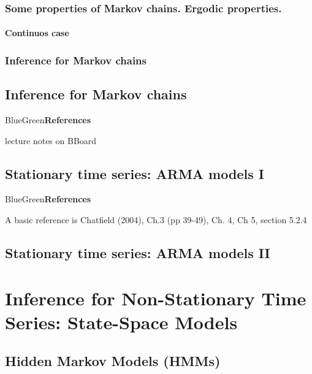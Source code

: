 \documentclass[dvipsnames,12pt]{book}
\begin{document}
        \section{Some properties of Markov chains. Ergodic properties.}

            \subsection{Continuos case}

        \section{Inference for Markov chains}

    \chapter{Inference for Markov chains}

            \begin{mybox}{BlueGreen}{\textbf{References}}

                lecture notes on BBoard
                
            \end{mybox}

    \chapter{Stationary time series: ARMA models I}

            \begin{mybox}{BlueGreen}{\textbf{References}}

                A basic reference is Chatfield (2004), Ch.3 (pp 39-49), Ch. 4, Ch 5, section 5.2.4
                
            \end{mybox}

    \chapter{Stationary time series: ARMA models II}
    
\part[Inference for Non-Stationary Time Series]{Inference for Non-Stationary Time Series: State-Space Models}

    \chapter{Hidden Markov Models (HMMs)}
\end{document}
